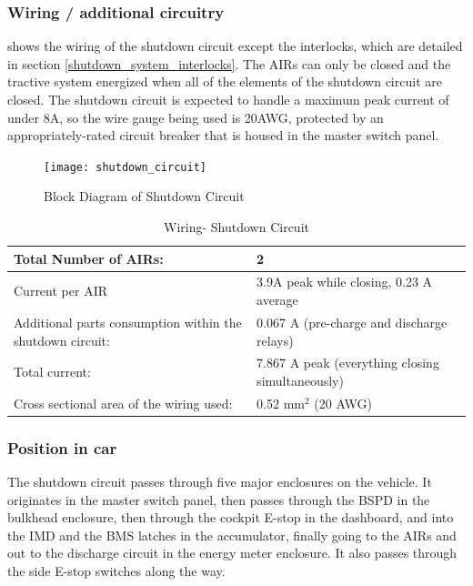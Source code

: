 \documentclass{article}
\begin{document}
\subsubsection{Wiring / additional circuitry} \label{sec:shutdown_wiring}

	 shows the wiring of the shutdown circuit except the interlocks, which are detailed in section \ref{shutdown_system_interlocks}. The AIRs can only be closed and the tractive system energized when all of the elements of the shutdown circuit are closed. The shutdown circuit is expected to handle a maximum peak current of under 8A, so the wire gauge being used is 20AWG, protected by an appropriately-rated circuit breaker that is housed in the master switch panel. 


	\begin{figure}
        \texttt{[image: shutdown\_circuit]}
        \caption{Block Diagram of Shutdown Circuit}
        \label{fig:shutdown_circuit}
    \end{figure}

	\begin{table}[H]
        \centering
        \begin{tabular}{|l|l|}
        \hline
            Total Number of AIRs: & 2 \\ \hline
            Current per AIR & 3.9A peak while closing, 0.23 A average\\ \hline
            Additional parts consumption within the shutdown circuit: & 0.067 A (pre-charge and discharge relays)  \\ \hline
            Total current: & 7.867 A peak (everything closing simultaneously) \\ \hline
            Cross sectional area of the wiring used: & 0.52 mm$^2$ (20 AWG) \\ \hline
        \end{tabular}
        \caption{Wiring- Shutdown Circuit}
        \label{ShutdownCircuitTable}
    \end{table}

\subsubsection{Position in car}
The shutdown circuit passes through five major enclosures on the vehicle. It originates in the master switch panel, then passes through the BSPD in the bulkhead enclosure, then through the cockpit E-stop in the dashboard, and into the IMD and the BMS latches in the accumulator, finally going to the AIRs and out to the discharge circuit in the energy meter enclosure. It also passes through the side E-stop switches along the way. \newline
\end{document}
